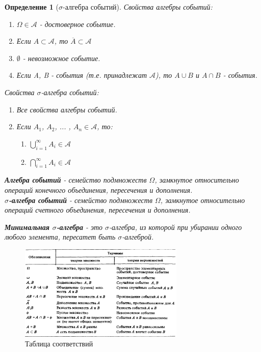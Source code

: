 \documentclass[14pt]{extarticle}
\theoremstyle{breakstyle}
\newtheorem{definition}{Определение}[subsection]
\begin{document}
\begin{definition}[$\sigma$-алгебра событий]

Свойства алгебры событий:
\begin{enumerate}
    \item $\Omega \in \mathscr{A}$ - достоверное событие.
    \item Если $A \subset \mathscr{A}$, то $\overline{A} \subset \mathscr{A}$
    \item $\emptyset$ - невозможное событие.
    \item Если A, B - события (т.е. принадлежат $\mathscr{A}$), то $A \cup B$ и $A \cap B$ - события. 
\end{enumerate}

\vspace{\baselineskip}
Свойства $\sigma$-алгебра событий:
\begin{enumerate}
    \item Все свойства алгебры событий.
    \item Если $A_1$, $A_2$, ... , $A_n \in \mathscr{A}$, то:
    \begin{enumerate}
        \item $\bigcup_{i=1}^{\infty} A_i \in \mathscr{A}$
        \item $\bigcap_{i=1}^{\infty} A_i \in \mathscr{A}$
    \end{enumerate}
\end{enumerate}

\vspace{\baselineskip}

\textbf{Алгебра событий} - семейство подмножеств $\Omega$, замкнутое относительно операций конечного объединения, пересечения и дополнения. \\
\textbf{$\sigma$-алгебра событий} - семейство подмножеств $\Omega$, замкнутое относительно операций счетного объединения, пересечения и дополнения.

\vspace{\baselineskip}

\textbf{Минимальная $\sigma$-алгебра} - это $\sigma$-алгебра, из которой при убирании одного любого элемента, пересатет быть $\sigma$-алгеброй.

\end{definition}

\begin{figure}[H]
    \centering
    \includegraphics[width=0.7\textwidth]{images/table.png}
    \caption{Таблица соответствий}
    \label{fig:prob-table}
\end{figure}
\end{document}
